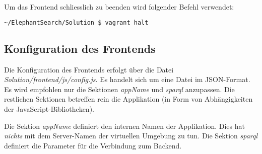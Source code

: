 Um das Frontend schliesslich zu beenden wird folgender Befehl verwendet:
\begin{lstlisting}[language=bash]
    ~/ElephantSearch/Solution $ vagrant halt
\end{lstlisting}

\subsection{Konfiguration des Frontends}
\label{chap:anh:ihb:frontend:config}
Die Konfiguration des Frontends erfolgt über die Datei \textit{Solution/frontend/js/config.js}. Es handelt sich um eine Datei im JSON-Format. Es wird empfohlen nur die Sektionen \textit{appName} und \textit{sparql} anzupassen. Die restlichen Sektionen betreffen rein die Applikation (in Form von Abhängigkeiten der JavaScript-Bibliotheken).

Die Sektion \textit{appName} definiert den internen Namen der Applikation. Dies hat \textit{nichts} mit dem Server-Namen der virtuellen Umgebung zu tun. Die Sektion \textit{sparql} definiert die Parameter für die Verbindung zum Backend.
